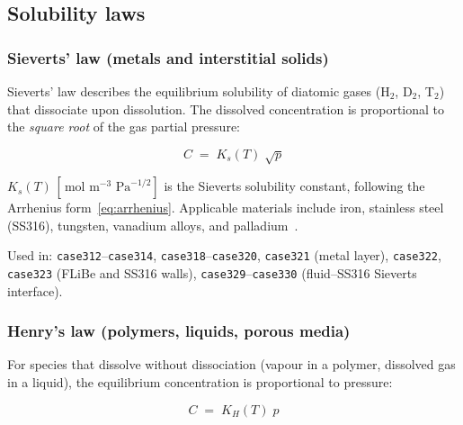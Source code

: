 \documentclass[11pt,a4paper]{article}
\newcommand{\mol}{\,\text{mol}}
\newcommand{\m}{\,\text{m}}
\newcommand{\Pa}{\,\text{Pa}}
\newcommand{\caseref}[1]{\texttt{\color{casegreen}#1}}
\begin{document}
\subsection{Solubility laws}
\label{sec:sol}

\subsubsection{Sieverts' law (metals and interstitial solids)}

Sieverts' law describes the equilibrium solubility of diatomic gases (H$_2$,
D$_2$, T$_2$) that dissociate upon dissolution.  The dissolved concentration
is proportional to the \emph{square root} of the gas partial pressure:

\begin{tcolorbox}[eqbox,title={Sieverts' law}]
\begin{equation}\label{eq:sieverts}
  C \;=\; K_s(T)\;\sqrt{p}
\end{equation}
\end{tcolorbox}

$K_s(T)\,[\mol\,\m^{-3}\,\Pa^{-1/2}]$ is the Sieverts solubility constant,
following the Arrhenius form~\eqref{eq:arrhenius}.  Applicable materials
include iron, stainless steel (SS316), tungsten, vanadium alloys, and palladium~\cite{Ockwig2007}.

\begin{tcolorbox}[casebox]
  Used in: \caseref{case312}–\caseref{case314}, \caseref{case318}–\caseref{case320},
  \caseref{case321} (metal layer), \caseref{case322},
  \caseref{case323} (FLiBe and SS316 walls),
  \caseref{case329}–\caseref{case330} (fluid–SS316 Sieverts interface).
\end{tcolorbox}

\subsubsection{Henry's law (polymers, liquids, porous media)}

For species that dissolve without dissociation (vapour in a polymer, dissolved
gas in a liquid), the equilibrium concentration is proportional to pressure:

\begin{tcolorbox}[eqbox,title={Henry's law}]
\begin{equation}\label{eq:henry}
  C \;=\; K_H(T)\;p
\end{equation}
\end{tcolorbox}
\end{document}

